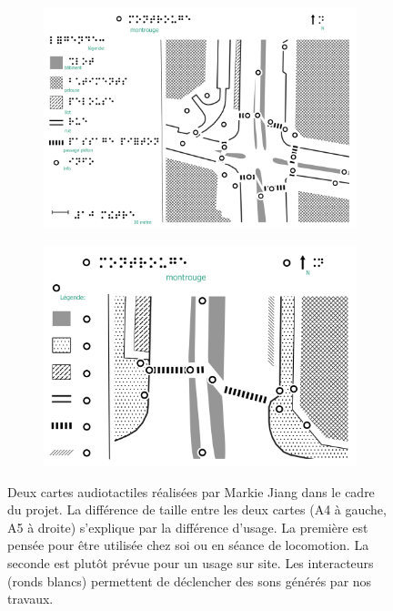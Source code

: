 \begin{figure}[ht]
    \centering
    \begin{subfigure}[t]{.49\linewidth}
        \centering
        \includegraphics[width=\textwidth]{images/experimentation/poc1_a4.png}
    \end{subfigure}
    \begin{subfigure}[t]{.49\linewidth}
        \centering
        \includegraphics[width=\textwidth]{images/experimentation/poc1_a5.png}
    \end{subfigure}
    \caption[Exemples de cartes audiotactiles]{Deux cartes audiotactiles réalisées par Markie Jiang \citep{jiang:tel-04500971} dans le cadre du projet. La différence de taille entre les deux cartes (A4 à gauche, A5 à droite) s'explique par la différence d'usage. La première est pensée pour être utilisée chez soi ou en séance de locomotion. La seconde est plutôt prévue pour un usage sur site. Les interacteurs (ronds blancs) permettent de déclencher des sons générés par nos travaux.}
    \label{fig:experimentation_exemples_cartes_audiotactiles}
\end{figure}

